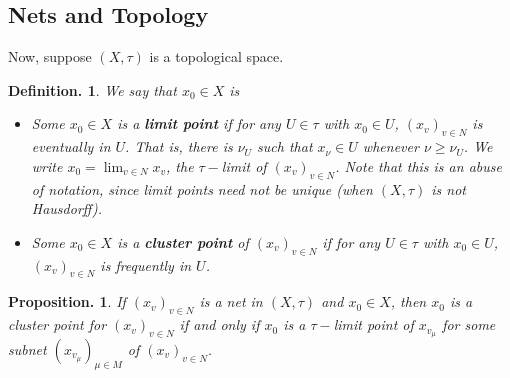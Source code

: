 \documentclass[11pt, a4paper]{memoir}
\theoremstyle{change}
\newtheorem{proposition}[theorem]{Proposition.}
\theoremstyle{plain}
\theoremstyle{nonumberplain}
\newtheorem{definition}{Definition.}
\numberwithin{equation}{section}
\begin{document}
\subsection{Nets and Topology}
Now, suppose $(X,\tau)$ is a topological space.
\begin{definition}
    We say that $x_0\in X$ is
    \begin{itemize}[nl]
        \item Some $x_0\in X$ is a \textbf{limit point} if for any $U\in\tau$ with $x_0\in U$, $(x_v)_{v\in N}$ is eventually in $U$.
            That is, there is $\nu_U$ such that $x_\nu\in U$ whenever $\nu\geq\nu_U$.
            We write $x_0=\lim_{v\in N}x_v$, the $\tau-$limit of $(x_v)_{v\in N}$.
            Note that this is an abuse of notation, since limit points need not be unique (when $(X,\tau)$ is not Hausdorff).
        \item Some $x_0\in X$ is a \textbf{cluster point} of $(x_v)_{v\in N}$ if for any $U\in\tau$ with $x_0\in U$, $(x_v)_{v\in N}$ is frequently in $U$.
    \end{itemize}
\end{definition}
\begin{proposition}
    If $(x_v)_{v\in N}$ is a net in $(X,\tau)$ and $x_0\in X$, then $x_0$ is a cluster point for $(x_v)_{v\in N}$ if and only if $x_0$ is a $\tau-$limit point of $x_{v_\mu}$ for some subnet $(x_{v_\mu})_{\mu\in M}$ of $(x_v)_{v\in N}$.
\end{proposition}
\end{document}
